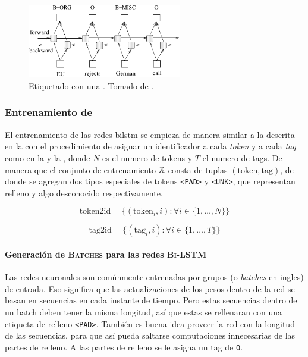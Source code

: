 \begin{figure}[H]
  \centering
  \includegraphics[width=0.6\textwidth]{Figures/bilstm-arch.pdf}
\decoRule
\caption[Etiquetado con una ]{Etiquetado con una . Tomado de \cite{Huang2015}.}
\label{fig:bilstm-arch}
\end{figure}


\subsubsection{Entrenamiento de }
El entrenamiento de las redes \gls{bilstm} se empieza de manera similar a la descrita en la  con el procedimiento de asignar un identificador a cada \emph{token} y a cada \emph{tag} como en la  y la , donde $N$ es el numero de tokens y $T$ el numero de tags. De manera que el conjunto de entrenamiento ${\mathbb{X}}$ consta de tuplas $(\text{token}, \text{tag})$, de donde se agregan dos tipos especiales de tokens \texttt{<PAD>} y \texttt{<UNK>}, que representan relleno y algo desconocido respectivamente.

\begin{equation} \label{eq:lstm-token2id}
  \text{token2id} = \Big\{(\text{token}_i, i) : \forall i \in \{1, \ldots, N\} \Big\}
\end{equation}

\begin{equation} \label{eq:lstm-tag2id}
  \text{tag2id} = \Big\{(\text{tag}_i, i) : \forall i \in \{1, \ldots, T\} \Big\}
\end{equation}

\paragraph{Generación de \textsc{Batches} para las redes \textsc{Bi-LSTM}}
Las redes neuronales son comúnmente entrenadas por grupos (o \emph{batches} en ingles) de entrada. Eso significa que las actualizaciones de los pesos dentro de la red se basan en secuencias en cada instante de tiempo. Pero estas secuencias dentro de un batch deben tener la misma longitud, así que estas se rellenaran con una etiqueta de relleno \texttt{<PAD>}. También es buena idea proveer la red con la longitud de las secuencias, para que así pueda saltarse computaciones innecesarias de las partes de relleno. A las partes de relleno se le asigna un tag de \texttt{O}.

